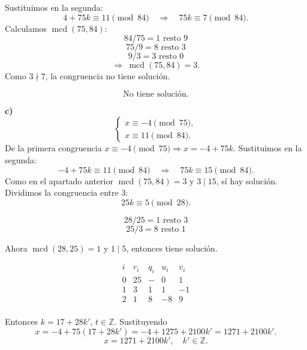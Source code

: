 \documentclass[a4paper,12pt]{article}
\begin{document}
\begin{ejercicio}[title=Ejercicio 37]

Sustituimos en la segunda:
\[
4+75k \equiv 11 \pmod{84}\quad\Longrightarrow\quad 75k \equiv 7 \pmod{84}.
\]
Calculamos $\operatorname{mcd}(75,84)$:
\[
84 / 75 = 1 \text{ resto } 9
\]
\[
75 / 9 = 8 \text{ resto } \boxed{3}
\]
\[
9 / 3 = 3 \text{ resto } 0
\]
\[
\Rightarrow\ \operatorname{mcd}(75,84)=3.
\]
Como $3\nmid 7$, la congruencia no tiene solución.

\[
\boxed{\text{No tiene solución.}}
\]

\vspace{0.8em}

\textbf{c)} \\[0.3em]
\[
\begin{cases}
x \equiv -4 \pmod{75},\\
x \equiv 11 \pmod{84}.
\end{cases}
\]
De la primera congruencia $x\equiv -4\pmod{75}\Rightarrow x=-4+75k$. Sustituimos en la segunda:
\[
-4 + 75k \equiv 11 \pmod{84}\quad\Longrightarrow\quad 75k \equiv 15 \pmod{84}.
\]
Como en el apartado anterior $\operatorname{mcd}(75,84)=3$ y $3\mid 15$, sí hay solución. Dividimos la congruencia entre $3$:
\[
25k \equiv 5 \pmod{28}.
\]

\[
28 / 25 = 1 \text{ resto } 3
\]
\[
25 / 3 = 8 \text{ resto } \boxed{1}
\]

Ahora $\operatorname{mcd}(28,25) = 1$ y $1\mid 5$, entonces tiene solución.

\[
\begin{array}{c|c|c|c|c}
i & r_i & q_i & u_i & v_i \\ \hline
0 & 25 & - & 0 & 1 \\
1 & 3 & 1 & 1 & -1 \\
2 & \boxed{1} & 8 & -8 & 9 \\
\end{array}
\]

Entonces $k = 17 + 28k'$, $t\in\mathbb{Z}$. Sustituyendo
\[
x = -4 + 75(17 + 28k') = -4 + 1275 + 2100k' = 1271 + 2100k'.
\]
\[
\boxed{x = 1271 + 2100k',\quad k'\in\mathbb{Z}.}
\]

\end{ejercicio}
\end{document}
